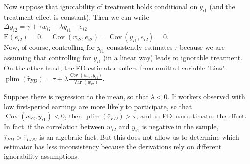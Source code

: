 \documentclass[10pt]{article}
\begin{document}
Now suppose that ignorability of treatment holds conditional on $y_{i 1}$ (and the treatment effect is constant). Then we can write\\
$\Delta y_{i 2}=\gamma+\tau w_{i 2}+\lambda y_{i 1}+e_{i 2}$\\
$\mathrm{E}\left(e_{i 2}\right)=0, \quad \operatorname{Cov}\left(w_{i 2}, e_{i 2}\right)=\operatorname{Cov}\left(y_{i 1}, e_{i 2}\right)=0$.\\
Now, of course, controlling for $y_{i 1}$ consistently estimates $\tau$ because we are assuming that controlling for $y_{i 1}$ (in a linear way) leads to ignorable treatment. On the other hand, the FD estimator suffers from omitted variable "bias":\\
$\operatorname{plim}\left(\hat{\tau}_{F D}\right)=\tau+\lambda \frac{\operatorname{Cov}\left(w_{i 2}, y_{i 1}\right)}{\operatorname{Var}\left(w_{i 2}\right)}$.

Suppose there is regression to the mean, so that $\lambda<0$. If workers observed with low first-period earnings are more likely to participate, so that $\operatorname{Cov}\left(w_{i 2}, y_{i 1}\right)<0$, then $\operatorname{plim}\left(\hat{\tau}_{F D}\right)>\tau$, and so FD overestimates the effect. In fact, if the correlation between $w_{i 2}$ and $y_{i 1}$ is negative in the sample, $\hat{\tau}_{F D}>\hat{\tau}_{L D V}$ is an algebraic fact. But this does not allow us to determine which estimator has less inconsistency because the derivations rely on different ignorability assumptions.
\end{document}
